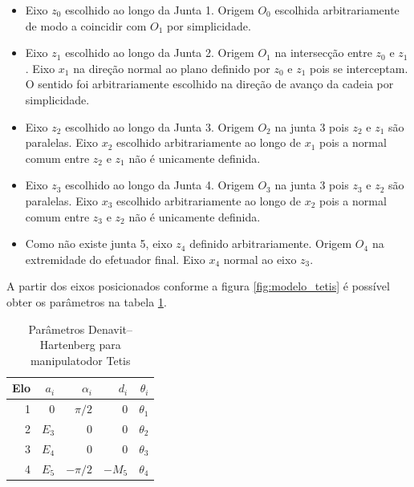 \begin{itemize}
\item Eixo $z_0$ escolhido ao longo da Junta 1. Origem $O_0$ escolhida arbitrariamente de modo a coincidir com $O_1$ por simplicidade.  
\item Eixo $z_1$ escolhido ao longo da Junta 2. Origem $O_1$ na intersecção entre $z_0$ e $z_1$. Eixo $x_1$ na direção normal ao plano definido por $z_0$ e $z_1$ pois se interceptam. O sentido foi arbitrariamente escolhido na direção de avanço da cadeia por simplicidade.
\item Eixo $z_2$ escolhido ao longo da Junta 3. Origem $O_2$ na junta 3 pois $z_2$ e $z_1$ são paralelas. Eixo $x_2$ escolhido arbitrariamente ao longo de  $x_1$ pois a normal comum entre $z_2$ e $z_1$ não é unicamente definida.
\item Eixo $z_3$ escolhido ao longo da Junta 4. Origem $O_3$ na junta 3 pois $z_3$ e $z_2$ são paralelas. Eixo $x_3$ escolhido arbitrariamente ao longo de  $x_2$ pois a normal comum entre $z_3$ e $z_2$ não é unicamente definida.
\item Como não existe junta 5, eixo $z_4$ definido arbitrariamente. Origem $O_4$ na extremidade do efetuador final. Eixo $x_4$ normal ao eixo $z_3$.
\end{itemize}

A partir dos eixos posicionados conforme a figura \ref{fig:modelo_tetis} é possível obter os parâmetros na tabela \ref{tab:dh_tetis}. 


\begin{table}[h!]
\centering
\caption{Parâmetros Denavit–Hartenberg para manipulatodor Tetis}
\label{tab:dh_tetis}
\begin{tabular}{rrrrr} \hline
Elo & $a_i$ & $\alpha_i$ & $d_i$  & $\theta_i$ \\ \hline
1   & 0     & $\pi/2$    & 0      & $\theta_1$ \\
2   & $E_3$ & 0          & 0      & $\theta_2$ \\
3   & $E_4$ & 0          & 0      & $\theta_3$ \\
4   & $E_5$ & $-\pi/2$   & $-M_5$ & $\theta_4$ \\ \hline
\end{tabular}
\end{table}


